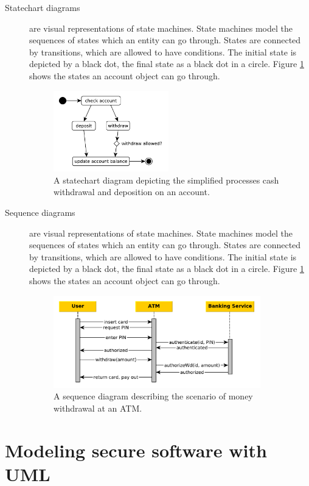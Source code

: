 \documentclass{acmtog} %
\begin{document}
\begin{description}
	\item[Statechart diagrams] are visual representations of state machines.
	State machines model the sequences of states which an entity can go through.
	States are connected by transitions, which are allowed to have conditions.
	The initial state is depicted by a black dot, the final state as a black dot in a circle.
	Figure \ref{fig:statechart-diagram} shows the states an account object can go through.
	\begin{figure}[ht]
		\centerline{\includegraphics[width=5cm]{img/uml-banking/statechart-diagram}}
		\caption{A statechart diagram depicting the simplified processes cash withdrawal and deposition on an account.}
		\label{fig:statechart-diagram}
	\end{figure}

	\item[Sequence diagrams] are visual representations of state machines.
	State machines model the sequences of states which an entity can go through.
	States are connected by transitions, which are allowed to have conditions.
	The initial state is depicted by a black dot, the final state as a black dot in a circle.
	Figure \ref{fig:statechart-diagram} shows the states an account object can go through.
	\begin{figure}[ht]
		\centerline{\includegraphics[width=9cm]{img/uml-banking/sequence-diagram}}
		\caption{A sequence diagram describing the scenario of money withdrawal at an ATM.}
		\label{fig:sequence-diagram}
	\end{figure}
\end{description}

\section{Modeling secure software with UML}
\label{sec:umlsec}
\end{document}
